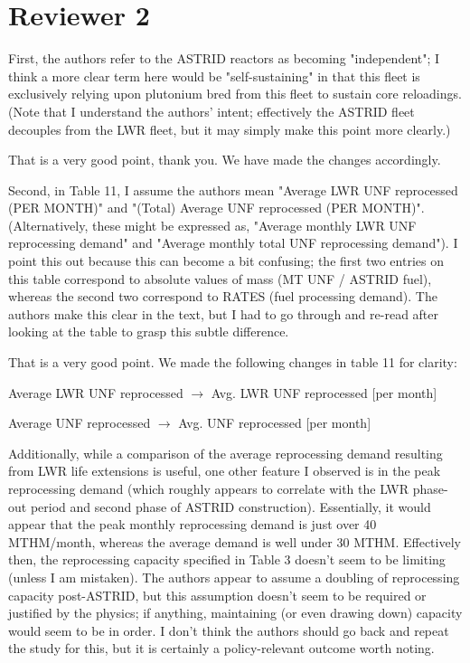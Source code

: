 \documentclass[answers,11pt]{exam}
\begin{document}
\section*{Reviewer 2}
\begin{questions}
    \question First, the authors refer to the ASTRID reactors as becoming "independent"; I think a more clear term here would be "self-sustaining" in that this fleet is exclusively relying upon plutonium bred from this fleet to sustain core reloadings. (Note that I understand the authors' intent; effectively the ASTRID fleet decouples from the LWR fleet, but it may simply make this point more clearly.)

    \begin{solution}
    That is a very good point, thank you. We have made the changes
    accordingly.
    \end{solution}

    \question Second, in Table 11, I assume the authors mean "Average LWR UNF reprocessed (PER MONTH)" and "(Total) Average UNF reprocessed (PER MONTH)". (Alternatively, these might be expressed as, "Average monthly LWR UNF reprocessing demand" and "Average monthly total UNF reprocessing demand"). I point this out because this can become a bit confusing; the first two entries on this table correspond to absolute values of mass (MT UNF / ASTRID fuel), whereas the second two correspond to RATES (fuel processing demand). The authors make this clear in the text, but I had to go through and re-read after looking at the table to grasp this subtle difference.

    \begin{solution}
    That is a very good point. We made the following changes
    in table 11 for clarity:
    
    Average LWR UNF reprocessed $\rightarrow$ Avg. LWR UNF reprocessed [per month]

    Average UNF reprocessed $\rightarrow$ Avg. UNF reprocessed [per month]

    \end{solution}

    \question Additionally, while a comparison of the average reprocessing demand resulting from LWR life extensions is useful, one other feature I observed is in the peak reprocessing demand (which roughly appears to correlate with the LWR phase-out period and second phase of ASTRID construction). Essentially, it would appear that the peak monthly reprocessing demand is just over 40 MTHM/month, whereas the average demand is well under 30 MTHM. Effectively then, the reprocessing capacity specified in Table 3 doesn't seem to be limiting (unless I am mistaken). The authors appear to assume a doubling of reprocessing capacity post-ASTRID, but this assumption doesn't seem to be required or justified by the physics; if anything, maintaining (or even drawing down) capacity would seem to be in order. I don't think the authors should go back and repeat the study for this, but it is certainly a policy-relevant outcome worth noting.


\end{questions}
\end{document}
